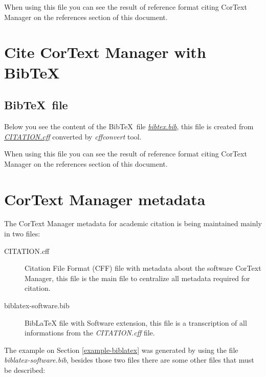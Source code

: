 \documentclass{article}
\begin{document}

When using this file you can see the result of reference format citing CorText
Manager \cite{cortext_manager_v2} on the references section of this document.

\section{Cite CorText Manager with Bib\TeX} \label{example-bibtex}

\printbibliography[type=misc,keyword=cortext,title={\small References (example)}]

\subsection{Bib\TeX \ file}

Below you see the content of the Bib\TeX \ file
\href{https://github.com/cortext/how-to-cite-cortext/blob/main/bibtex.bib}{\em bibtex.bib},
this file is created from
\href{https://github.com/cortext/how-to-cite-cortext/blob/main/CITATION.cff}{\em CITATION.cff}
converted by {\em cffconvert} tool.


When using this file you can see the result of reference format citing CorText
Manager \cite{cortext_manager_v2_bibtex} on the references section of this document.

\section{CorText Manager metadata}

The CorText Manager metadata for academic citation is being maintained mainly in two files:

\begin{description}
  \item[CITATION.cff] Citation File Format (CFF) file with metadata about the software CorText Manager,
    this file is the main file to centralize all metadata required for citation.
  \item[biblatex-software.bib] BibLaTeX file with Software extension,
    this file is a transcription of all informations from the {\em CITATION.cff} file.
\end{description}

The example on Section \ref{example-biblatex} was generated by using the file
{\em biblatex-software.bib}, besides those two files there are some other
files that must be described:
\end{document}
